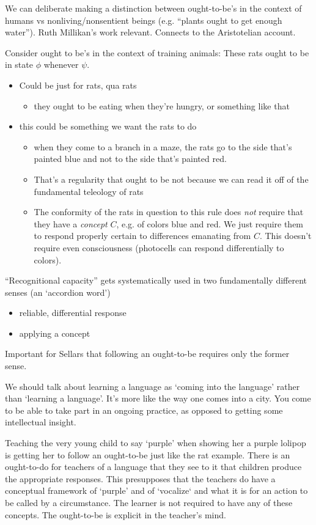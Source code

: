 We can deliberate making a distinction between ought-to-be's in the context of humans vs nonliving/nonsentient beings (e.g. ``plants ought to get enough water''). Ruth Millikan's work relevant. Connects to the Aristotelian account.

Consider ought to be's in the context of training animals: These rats ought to be in state $\phi$ whenever $\psi$.
\begin{itemize}
\item Could be just for rats, qua rats
 \begin{itemize}
 \item they ought to be eating when they're hungry, or something like that
 \end{itemize}
\item this could be something we want the rats to do
\begin{itemize}
    \item when they come to a branch in a maze, the rats go to the side that's painted blue and not to the side that's painted red.
    \item That's a regularity that ought to be not because we can read it off of the fundamental teleology of rats
    \item The conformity of the rats in question to this rule does \emph{not} require that they have a \emph{concept} $C$, e.g. of colors blue and red. We just require them to respond properly certain to differences emanating from $C$. This doesn't require even consciousness (photocells can respond differentially to colors).
\end{itemize}
\end{itemize}

``Recognitional capacity'' gets systematically used in two fundamentally different senses (an `accordion word')
\begin{itemize}
\item reliable, differential response
\item applying a concept
\end{itemize}

Important for Sellars that following an ought-to-be requires only the former sense.

We should talk about learning a language as `coming into the language' rather than `learning a language'. It's more like the way one comes into a city. You come to be able to take part in an ongoing practice, as opposed to getting some intellectual insight.

Teaching the very young child to say `purple' when showing her a purple lolipop is getting her to follow an ought-to-be just like the rat example. There is an ought-to-do for teachers of a language that they see to it that children produce the appropriate responses. This presupposes that the teachers do have a conceptual framework of `purple' and of `vocalize` and what it is for an action to be called by a circumstance. The learner is not required to have any of these concepts. The ought-to-be is explicit in the teacher's mind.




